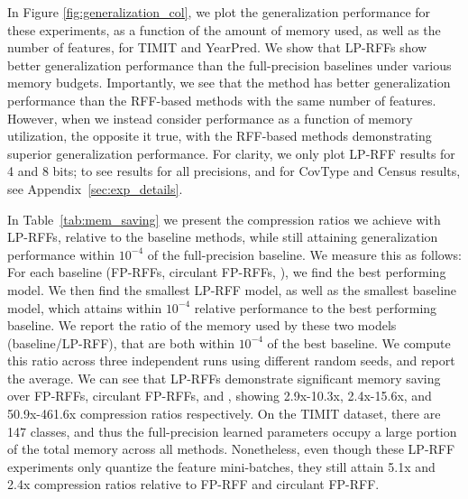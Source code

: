 In Figure \ref{fig:generalization_col}, we plot the generalization performance for these experiments, as a function of the amount of memory used, as well as the number of features, for TIMIT and YearPred. We show that LP-RFFs show better generalization performance than the full-precision baselines under various memory budgets. Importantly, we see that the \Nystrom method has better generalization performance than the RFF-based methods with the same number of features. However, when we instead consider performance as a function of memory utilization, the opposite it true, with the RFF-based methods demonstrating superior generalization performance. For clarity, we only plot LP-RFF results for 4 and 8 bits; to see results for all precisions, and for CovType and Census results, see Appendix~\ref{sec:exp_details}.

In Table~\ref{tab:mem_saving} we present the compression ratios we achieve with LP-RFFs, relative to the baseline methods, while still attaining generalization performance within $10^{-4}$ of the full-precision baseline.  We measure this as follows: For each baseline (FP-RFFs, circulant FP-RFFs, \NystromNS), we find the best performing model. We then find the smallest LP-RFF model, as well as the smallest baseline model, which attains within $10^{-4}$ relative performance to the best performing baseline. We report the ratio of the memory used by these two models (baseline/LP-RFF), that are both within $10^{-4}$ of the best baseline. We compute this ratio across three independent runs using different random seeds, and report the average.  We can see that LP-RFFs demonstrate significant memory saving over FP-RFFs, circulant FP-RFFs, and \NystromNS, showing 2.9x-10.3x, 2.4x-15.6x, and 50.9x-461.6x compression ratios respectively. On the TIMIT dataset, there are 147 classes, and thus the full-precision learned parameters occupy a large portion of the total memory across all methods. Nonetheless, even though these LP-RFF experiments only quantize the feature mini-batches, they still attain 5.1x and 2.4x compression ratios relative to FP-RFF and circulant FP-RFF.

